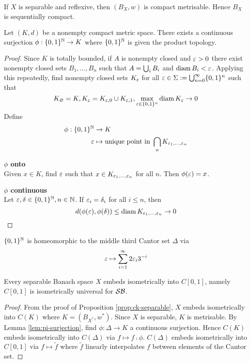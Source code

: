 \documentclass{article}
\begin{document}
\begin{rmk}
  If $X$ is separable and reflexive, then $(B_X, w)$ is compact metrisable. Hence $B_X$ is sequentially compact.
\end{rmk}

\begin{lem}\label{lem:pi-surjection}
  Let $(K, d)$ be a nonempty compact metric space. There exists a continuous surjection $\phi : \{0, 1\}^\mathbb N \to K$ where $\{0, 1\}^\mathbb N$ is given the product topology.
\end{lem}
\begin{proof}
  Since $K$ is totally bounded, if $A$ is nonempty closed and $\varepsilon > 0$ there exist nonempty closed sets $B_1, \dots, B_n$ such that $A = \bigcup_i B_i$ and $\operatorname{diam} B_i < \varepsilon$. Applying this repeatedly, find nonempty closed sets $K_\varepsilon$ for all $\varepsilon \in \Sigma := \bigcup_{n = 0}^\infty \{0, 1\}^n$ such that
  $$K_\varnothing = K, K_\varepsilon = K_{\varepsilon, 0} \cup K_{\varepsilon, 1}, \max_{\varepsilon \in \{0, 1\}^n} \operatorname{diam} K_\varepsilon \to 0$$
  Define
  \begin{align*}
    \phi : \{0, 1\}^\mathbb N & \to K \\
    \varepsilon & \mapsto \text{unique point in } \bigcap_n K_{\varepsilon_1, \dots, \varepsilon_n}
  \end{align*}

  {\bf $\phi$ onto} \\
  Given $x \in K$, find $\varepsilon$ such that $x \in K_{\varepsilon_1, \dots, \varepsilon_n}$ for all $n$. Then $\phi(\varepsilon) = x$.

  {\bf $\phi$ continuous} \\
  Let $\varepsilon, \delta \in \{0, 1\}^\mathbb N, n \in \mathbb N$. If $\varepsilon_i = \delta_i$ for all $i \le n$, then
  $$d(\phi(\varepsilon), \phi(\delta)) \le \operatorname{diam} K_{\varepsilon_1, \dots, \varepsilon_n} \to 0$$
\end{proof}

\begin{rmk}
  $\{0, 1\}^\mathbb N$ is homeomorphic to the middle third Cantor set $\Delta$ via
  $$\varepsilon \mapsto \sum_{i = 1}^\infty 2\varepsilon_i 3^{-i}$$
\end{rmk}

\begin{thm}
  Every separable Banach space $X$ embeds isometrically into $C[0, 1]$, namely $C[0, 1]$ is isometrically universal for $\mathcal S\mathcal B$.
\end{thm}
\begin{proof}
  From the proof of Proposition \ref{prop:ck-separable}, $X$ embeds isometrically into $C(K)$ where $K = (B_{X^*}, w^*)$. Since $X$ is separable, $K$ is metrisable. By Lemma \ref{lem:pi-surjection}, find $\phi : \Delta \to K$ a continuous surjection. Hence $C(K)$ embeds isometrically into $C(\Delta)$ via $f \mapsto f \comp \phi$. $C(\Delta)$ embeds isometrically into $C[0, 1]$ via $f \mapsto \tilde f$ where $\tilde f$ linearly interpolates $f$ between elements of the Cantor set.
\end{proof}
\end{document}
